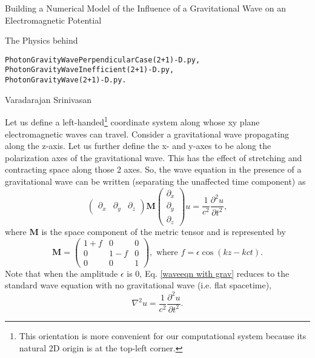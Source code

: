 \documentclass{article}
\begin{document}
\begin{flushleft}
{\large Building a Numerical Model of the Influence of a Gravitational Wave on an Electromagnetic Potential}
\end{flushleft}
The Physics behind
\vspace{-2ex}
\begin{verbatim}
PhotonGravityWavePerpendicularCase(2+1)-D.py,
PhotonGravityWaveInefficient(2+1)-D.py,
PhotonGravityWave(2+1)-D.py.
\end{verbatim}
\begin{flushright}
\bigskip
Varadarajan Srinivasan
\end{flushright}

\smallskip

Let us define a left-handed\footnote{This orientation is more convenient for our computational system because its natural 2D origin is at the top-left corner.} coordinate system along whose xy plane electromagnetic waves can travel. Consider a gravitational wave propagating along the z-axis. Let us further define the x- and y-axes to be along the polarization axes of the gravitational wave. This has the effect of stretching and contracting space along those 2 axes. So, the wave equation in the presence of a gravitational wave can be written (separating the unaffected time component) as
\begin{equation} \label{waveeqn with grav}
\begin{pmatrix}\partial_x & \partial_y & \partial_z\end{pmatrix} 
\textbf{M}
\begin{pmatrix} \partial_x \\ \partial_y \\ \partial_z \end{pmatrix}
u
=\frac{1}{c^2}\frac{\partial^2 u}{\partial t^2},
\end{equation}
where $\textbf{M}$ is the space component of the metric tensor and is represented by
\begin{equation} \label{M}
\textbf{M}=\begin{pmatrix}
1+f & 0 & 0 \\
0 & 1-f & 0 \\
0 & 0 & 1
\end{pmatrix},
\text{ \ \ \ where } f=\epsilon \cos(kz-kct).
\end{equation}
Note that when the amplitude $\epsilon$ is 0, Eq. \ref{waveeqn with grav} reduces to the standard wave equation with no gravitational wave (i.e. flat spacetime),
\begin{equation} \label{waveeqn flat}
\nabla^2u=\frac{1}{c^2}\frac{\partial^2u}{\partial t^2}.
\end{equation}
\end{document}
